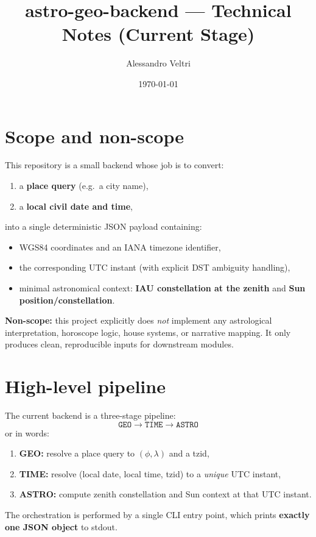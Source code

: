 \documentclass[11pt,a4paper]{article}
\title{astro-geo-backend --- Technical Notes (Current Stage)}
\author{Alessandro Veltri}
\date{\today}
\begin{document}
\maketitle

\section{Scope and non-scope}
This repository is a small backend whose job is to convert:
\begin{enumerate}[label=\arabic*.]
  \item a \textbf{place query} (e.g.\ a city name),
  \item a \textbf{local civil date and time},
\end{enumerate}
into a single deterministic JSON payload containing:
\begin{itemize}
  \item WGS84 coordinates and an IANA timezone identifier,
  \item the corresponding UTC instant (with explicit DST ambiguity handling),
  \item minimal astronomical context: \textbf{IAU constellation at the zenith} and \textbf{Sun position/constellation}.
\end{itemize}

\textbf{Non-scope:} this project explicitly does \emph{not} implement any astrological interpretation, horoscope logic, house systems, or narrative mapping. It only produces clean, reproducible inputs for downstream modules.

\section{High-level pipeline}
The current backend is a three-stage pipeline:
\[
\texttt{GEO} \rightarrow \texttt{TIME} \rightarrow \texttt{ASTRO}
\]
or in words:
\begin{enumerate}[label=\textbf{\alph*)}]
  \item \textbf{GEO:} resolve a place query to $(\phi,\lambda)$ and a tzid,
  \item \textbf{TIME:} resolve (local date, local time, tzid) to a \emph{unique} UTC instant,
  \item \textbf{ASTRO:} compute zenith constellation and Sun context at that UTC instant.
\end{enumerate}

The orchestration is performed by a single CLI entry point, which prints \textbf{exactly one JSON object} to stdout.
\end{document}
